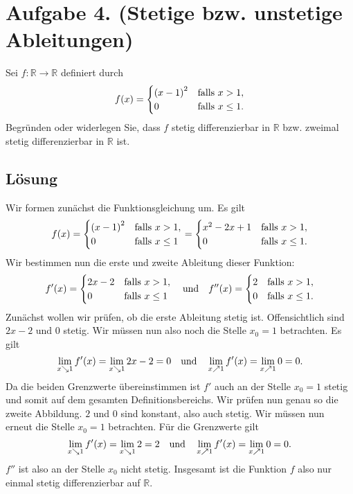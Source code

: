 \documentclass[german,12pt]{homework}
\newcommand{\RR}{\mathbb{R}}
\DeclarePairedDelimiter{\enbrace}{(}{)}
\begin{document}
    \section*{Aufgabe 4. (Stetige bzw. unstetige Ableitungen)}

    \begin{problem}
        Sei \(f: \RR \to \RR\) definiert durch
        \[f\enbrace*{x} = \begin{cases}
            \enbrace*{x - 1}^2 & \text{falls }x > 1,\\
            0 & \text{falls }x \le 1.
        \end{cases}\]
        Begründen oder widerlegen Sie, dass \(f\) stetig differenzierbar in \(\RR\) bzw. zweimal stetig differenzierbar in \(\RR\) ist.
    \end{problem}

    \subsection*{Lösung} Wir formen zunächst die Funktionsgleichung um. Es gilt
    \[f\enbrace*{x} = \begin{cases}
        \enbrace*{x - 1}^2 & \text{falls }x > 1,\\
        0 & \text{falls }x \le 1
    \end{cases} = \begin{cases}
        x^2 - 2x + 1 & \text{falls }x > 1,\\
        0 & \text{falls }x \le 1.
    \end{cases}\]
    Wir bestimmen nun die erste und zweite Ableitung dieser Funktion:
    \[f'\enbrace*{x} = \begin{cases}
        2x - 2 & \text{falls }x > 1,\\
        0 & \text{falls }x \le 1
    \end{cases} \quad \text{und} \quad f''\enbrace*{x} = \begin{cases}
        2 & \text{falls }x > 1,\\
        0 & \text{falls }x \le 1.
    \end{cases}\]
    Zunächst wollen wir prüfen, ob die erste Ableitung stetig ist. Offensichtlich sind \(2x - 2\) und \(0\) stetig. Wir müssen nun also noch die Stelle \(x_0 = 1\) betrachten. Es gilt
    \[\lim_{x \searrow 1}f'\enbrace*{x} = \lim_{x \searrow 1}2x - 2 = 0 \quad \text{und} \quad \lim_{x \nearrow 1}f'\enbrace*{x} = \lim_{x \nearrow 1}0 = 0.\]
    Da die beiden Grenzwerte übereinstimmen ist \(f'\) auch an der Stelle \(x_0 = 1\) stetig und somit auf dem gesamten Definitionsbereichs. Wir prüfen nun genau so die zweite Abbildung. \(2\) und \(0\) sind konstant, also auch stetig. Wir müssen nun erneut die Stelle \(x_0 = 1\) betrachten. Für die Grenzwerte gilt
    \[\lim_{x \searrow 1}f'\enbrace*{x} = \lim_{x \searrow 1}2 = 2 \quad \text{und} \quad \lim_{x \nearrow 1}f'\enbrace*{x} = \lim_{x \nearrow 1}0 = 0.\]
    \(f''\) ist also an der Stelle \(x_0\) nicht stetig. Insgesamt ist die Funktion \(f\) also nur einmal stetig differenzierbar auf \(\RR\).
\end{document}
